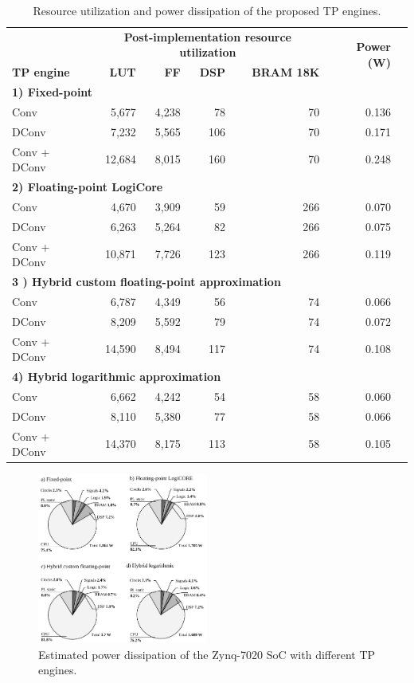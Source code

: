 \begin{table}[!htp]\centering
	\caption{Resource utilization and power dissipation of the proposed TP engines.}\label{tab:resource}
	\scriptsize
\begin{tabular}{lrrrrrr}\toprule
	\textbf{} &\multicolumn{4}{c}{\textbf{Post-implementation resource utilization}} &\multirow{2}{*}{\textbf{Power (W)}} \\\cmidrule{2-5}
	\textbf{TP engine} &\textbf{LUT} &\textbf{FF} &\textbf{DSP} &\textbf{BRAM 18K} & \\\midrule
	\multicolumn{6}{l}{\textbf{1) Fixed-point}} \\
	Conv &5,677 &4,238 &78 &70 &0.136 \\
	DConv &7,232 &5,565 &106 &70 &0.171 \\
	Conv + DConv &12,684 &8,015 &160 &70 &0.248 & \\\midrule
	\multicolumn{6}{l}{\textbf{2) Floating-point LogiCore}} \\
	Conv &4,670 &3,909 &59 &266 &0.070 \\
	DConv &6,263 &5,264 &82 &266 &0.075 \\
	Conv + DConv &10,871 &7,726 &123 &266 &0.119 \\\midrule
	\multicolumn{6}{l}{\textbf{3 ) Hybrid custom floating-point approximation}} \\
	Conv &6,787 &4,349 &56 &74 &0.066 \\
	DConv &8,209 &5,592 &79 &74 &0.072 \\
	Conv + DConv &14,590 &8,494 &117 &74 &0.108 & \\\midrule
	\multicolumn{6}{l}{\textbf{4) Hybrid logarithmic approximation}} \\
	Conv &6,662 &4,242 &54 &58 &0.060 \\
	DConv &8,110 &5,380 &77 &58 &0.066 \\
	Conv + DConv &14,370 &8,175 &113 &58 &0.105 \\
	\bottomrule
\end{tabular}
\end{table}

\begin{figure}[t!]
	\centering
	\includegraphics[width=0.5\textwidth]{../figures/power_breackdown.pdf}
	\caption{Estimated power dissipation of the Zynq-7020 SoC with different TP engines.}
	\label{fig:power}
\end{figure}

